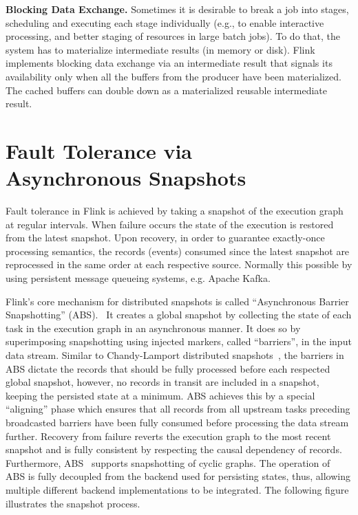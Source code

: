 \documentclass{sig-alternate}
\begin{document}
\textbf{Blocking Data Exchange.} Sometimes it is desirable to break a job into stages, scheduling and executing each stage individually (e.g., to enable interactive processing, and better staging of resources in large batch jobs). To do that, the system has to materialize intermediate results (in memory or disk). Flink implements blocking data exchange via an intermediate result that signals its availability only when all the buffers from the producer have been materialized. The cached buffers can double down as a materialized reusable intermediate result. 


\section{Fault Tolerance via \\ Asynchronous Snapshots}

Fault tolerance in Flink is achieved by taking a snapshot of the execution graph at regular intervals. When failure occurs the state of the execution is restored from the latest snapshot. Upon recovery, in order to guarantee exactly-once processing semantics, the records (events) consumed since the latest snapshot are reprocessed in the same order at each respective source. Normally this possible by using persistent message queueing systems, e.g. Apache Kafka.~\cite{CUSTOM:web/Kafka}

Flink's core mechanism for distributed snapshots is called ``Asynchronous Barrier Snapshotting'' (ABS).~\cite{carbone2015lightweight} It creates a global snapshot by collecting the state of each task in the execution graph in an asynchronous manner. It does so by superimposing snapshotting using injected markers, called ``barriers'', in the input data stream. Similar to Chandy-Lamport distributed snapshots~\cite{chandy1985distributed}, the barriers in ABS dictate the records that should be fully processed before each respected global snapshot, however, no records in transit are included in a snapshot, keeping the persisted state at a minimum. ABS achieves this by a special ``aligning'' phase which ensures that all records from all upstream tasks preceding broadcasted barriers have been fully consumed before processing the data stream further. Recovery from failure reverts the execution graph to the most recent snapshot and is fully consistent by respecting the causal dependency of records. Furthermore, ABS~\cite{carbone2015lightweight} supports snapshotting of cyclic graphs.  The operation of ABS is fully decoupled from the backend used for persisting states, thus, allowing multiple different backend implementations to be integrated. The following figure illustrates the snapshot process.
\end{document}
